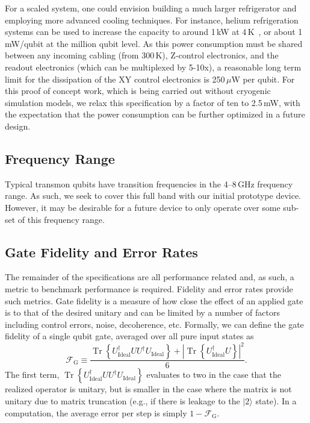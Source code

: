 \documentclass[journal]{IEEEtran}
\DeclareMathOperator{\Tr}{Tr}
\newcommand{\CR}[1]{{\color{black}#1}}
\begin{document}
For a scaled system, one could envision building a much larger refrigerator and employing more advanced cooling techniques. For instance, helium \CR{refrigeration systems} can be used to increase the capacity to around  1\,kW at 4\,K~\CR{\cite{linde}}, or  about 1\,mW/qubit at the million qubit level. As this power consumption must be shared between any incoming cabling (from 300\,K), Z-control electronics, and the readout electronics (which can be multiplexed by 5-10x), a reasonable long term limit for the dissipation of the \CR{XY} control electronics is 250\,$\mu$W per qubit. For this proof of concept work, which is being carried out without cryogenic simulation models, we relax this specification by a factor of ten to 2.5\,mW, with the expectation that the power consumption can be further optimized in a future design. 
\subsection{Frequency Range}
Typical transmon qubits have transition frequencies in the 4--8\,GHz frequency range. As such, we seek to cover this full band with our initial prototype device. However, it may be desirable for a future device to only operate over some sub-set of this frequency range.
\subsection{Gate Fidelity and Error Rates}
The remainder of the specifications are all performance related and, as such, a metric to benchmark performance is required. Fidelity and error rates provide such metrics. Gate fidelity is a measure of how close the effect of an applied gate is to that of the desired unitary and can be limited by a number of factors including control errors, noise, decoherence, etc. Formally, we can define the gate fidelity of a single qubit gate, averaged over all pure input states as~\cite{pedersen2007fidelity}
\begin{equation}
\mathscr{F}_\text{G}\equiv\frac{\Tr\left\{U_\text{Ideal}^\dagger{}UU^\dagger{}U_\text{Ideal}\right\}+\left|\Tr\left\{U_\text{Ideal}^\dagger{}U\right\}\right|^2}{6}.
\end{equation}
The first term, $\Tr\left\{U_\text{Ideal}^\dagger{}UU^\dagger{}U_\text{Ideal}\right\}$ evaluates to two in the case that the realized operator is unitary, but is smaller in the case where the matrix is not unitary due to matrix truncation (e.g., if there is leakage to the $|2\rangle$ state). 
In a computation, the average error per step is simply $1-\mathscr{F}_\text{G}$.
\end{document}
